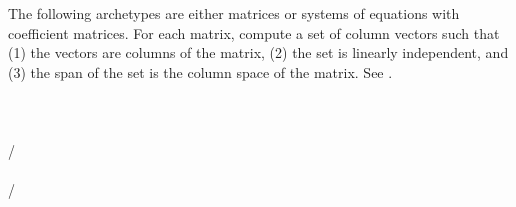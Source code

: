 The following archetypes are either matrices or systems of equations with coefficient matrices.  For each matrix, compute a set of column vectors such that (1) the vectors are columns of the matrix, (2) the set is linearly independent, and (3) the span of the set is the column space of the matrix.  See .\\
\\ 
\\ 
\\ 
/\\ 
\\ 
/\\ 
\\
\\
%
\\
\\


